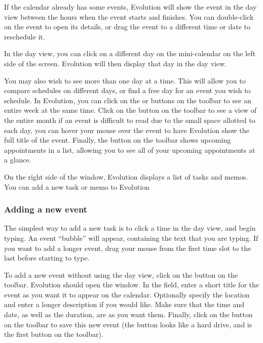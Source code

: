 If the calendar already has some events, Evolution will show the event
in the day view between the hours when the event starts and finishes. 
You can double-click on the event to open its details, or drag the event to
a different time or date to reschedule it.

In the day view, you can click on a different day on the mini-calendar on the
left side of the screen. Evolution will then display that day in the day view.

You may also wish to see more than one day at a time. This will allow you to 
compare schedules on different days, or find a free day for an event you 
wish to schedule. In Evolution, you can click on the  or
 buttons on the toolbar to see an entire week at the same time.
Click on the  button on the toolbar to see a view of the entire
month \dash if an event is difficult to read due to the small space allotted
to each day, you can hover your mouse over the event to have Evolution 
show the full title of the event. Finally, the  button on the 
toolbar shows upcoming appointments in a list, allowing you to see all of 
your upcoming appointments at a glance.

On the right side of the window, Evolution displays a list of tasks and memos.
You can add a new task or memo to Evolution

 \subsubsection{Adding a new event}

The simplest way to add a new task is to click a time in the day view, and
begin typing. An event ``bubble'' will appear, containing the text that you
are typing. If you want to add a longer event, drag your mouse from the first
time slot to the last before starting to type.


To add a new event without using the day view, click on the  
button on the toolbar. Evolution should open the  window.
In the  field, enter a short title for the event as you
want it to appear on the calendar. Optionally specify the location and enter
a longer description if you would like. Make sure that the time and date, as
well as the duration, are as you want them. Finally, click on the 
 button on the toolbar to save this new event (the button looks
like a hard drive, and is the first button on the toolbar).

